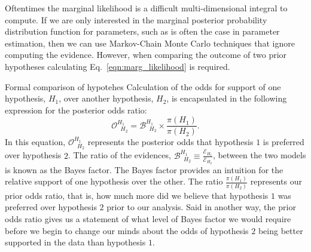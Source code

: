 Oftentimes the marginal likelihood is a difficult multi-dimensional integral to compute. If we are only interested in the marginal posterior probability distribution function for parameters, such as is often the case in parameter estimation, then we can use Markov-Chain Monte Carlo techniques that ignore computing the evidence. However, when comparing the outcome of two prior hypotheses calculating Eq.~\ref{eqn:marg_likelihood} is required.

Formal comparison of hypotehes
Calculation of the odds for support of one hypothesis, $H_1$, over another hypothesis, $H_2$, is encapsulated in the following expression for the posterior odds ratio:
\begin{equation}\label{eqn:odds_ratio}
\mathcal{O}^{H_1\;\;}_{\;\;H_2} = \mathcal{B}^{H_1\;\;}_{\;\;H_2} \times \frac{\pi(H_1)}{\pi(H_2)}.
\end{equation}
In this equation, $\mathcal{O}^{H_1\;\;}_{\;\;H_2}$ represents the posterior odds that hypothesis $1$ is preferred over hypothesis $2$. The ratio of the evidences, $\mathcal{B}^{H_1\;\;}_{\;\;H_2} \equiv \frac{\mathcal{E}_{H_1}}{\mathcal{E}_{H_2}}$, between the two models is known as the Bayes factor. The Bayes factor provides an intuition for the relative support of one hypothesis over the other. The ratio $\frac{\pi(H_1)}{\pi(H_2)}$ represents our prior odds ratio, that is, how much more did we believe that hypothesis $1$ was preferred over hypothesis $2$ prior to our analysis. Said in another way, the prior odds ratio gives us a statement of what level of Bayes factor we would require before we begin to change our minds about the odds of hypothesis $2$ being better supported in the data than hypothesis $1$.

